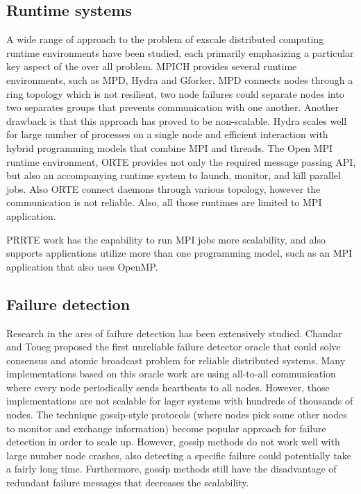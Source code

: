 \documentclass[sigconf]{acmart}
\begin{document}
\subsection{Runtime systems}
A wide range of approach to the problem of exscale distributed computing runtime environments have been studied, each primarily emphasizing a particular key aspect of the over all problem. MPICH provides several runtime environments, such as MPD\cite{Butler00}, Hydra and Gforker\cite{MPICH14}. MPD connects nodes through a ring topology which is not resilient, two node failures could separate nodes into two separates groups that prevents communication with one another. Another drawback is that this approach has proved to be non-scalable. Hydra scales well for large number of processes on a single node and efficient interaction with hybrid programming models that combine MPI and threads. The Open MPI runtime environment, ORTE\cite{Castain05}\cite{Jeffrey12} provides not only the required message passing API, but also an accompanying runtime system to launch, monitor, and kill parallel jobs. Also ORTE connect daemons through various topology, however the communication is not reliable. Also, all those runtimes are limited to MPI application.

PRRTE work has the capability to run MPI jobs more scalability, and also supports applications utilize more than one programming model, such as an MPI application that also uses OpenMP. 

\subsection{Failure detection}
Research in the ares of failure detection has been extensively studied. Chandar and Toueg\cite{Chandra96} proposed the first unreliable failure detector oracle that could solve consensus and atomic broadcast problem for reliable distributed systems. Many implementations\cite{Wei02}\cite{Larrea00}\cite{Kawazoe97} based on this oracle work are using all-to-all communication where every node periodically sends heartbeats to all nodes. However, those implementations are not scalable for lager systems with hundreds of thousands of nodes. The technique gossip-style protocols\cite{van98} \cite{Ranganathan01}\cite{Gupta01}\cite{Abhinandan02}  (where nodes pick some other nodes to monitor and exchange information) become popular approach for failure detection in order to scale up. However, gossip methods do not work well with large number node crashes, also detecting a specific failure could potentially take a fairly long time. Furthermore, gossip methods still have the disadvantage of redundant failure messages that decreases the scalability.
\end{document}
